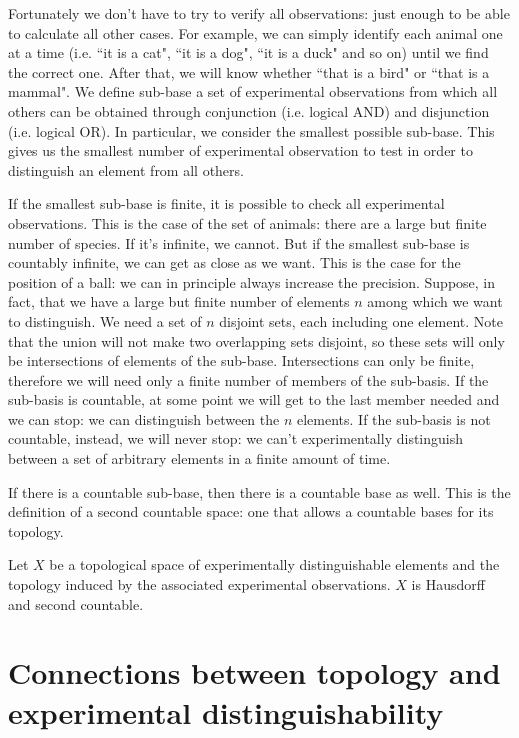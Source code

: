 \documentclass[11pt,letterpaper,fleqn]{memoir} %
\begin{document}
Fortunately we don't have to try to verify all observations: just enough to be able to calculate all other cases. For example, we can simply identify each animal one at a time (i.e. ``it is a cat", ``it is a dog", ``it is a duck" and so on) until we find the correct one. After that, we will know whether ``that is a bird" or ``that is a mammal". We define sub-base a set of experimental observations from which all others can be obtained through conjunction (i.e. logical AND) and disjunction (i.e. logical OR). In particular, we consider the smallest possible sub-base. This gives us the smallest number of experimental observation to test in order to distinguish an element from all others.

If the smallest sub-base is finite, it is possible to check all experimental observations. This is the case of the set of animals: there are a large but finite number of species. If it's infinite, we cannot. But if the smallest sub-base is countably infinite, we can get as close as we want. This is the case for the position of a ball: we can in principle always increase the precision. Suppose, in fact, that we have a large but finite number of elements $n$ among which we want to distinguish. We need a set of $n$ disjoint sets, each including one element. Note that the union will not make two overlapping sets disjoint, so these sets will only be intersections of elements of the sub-base. Intersections can only be finite, therefore we will need only a finite number of members of the sub-basis. If the sub-basis is countable, at some point we will get to the last member needed and we can stop: we can distinguish between the $n$ elements. If the sub-basis is not countable, instead, we will never stop: we can't experimentally distinguish between a set of arbitrary elements in a finite amount of time.

If there is a countable sub-base, then there is a countable base as well. This is the definition of a second countable space: one that allows a countable bases for its topology.

\begin{prop}
	Let $X$ be a topological space of experimentally distinguishable elements and the topology induced by the associated experimental observations. $X$ is Hausdorff and second countable.
\end{prop}

\section{Connections between topology and experimental distinguishability}
\end{document}

